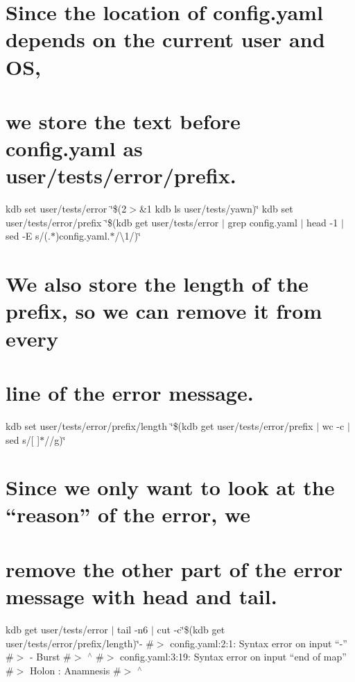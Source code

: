 \section*{Since the location of {\ttfamily config.\+yaml} depends on the current user and OS,}

\section*{we store the text before {\ttfamily config.\+yaml} as {\ttfamily user/tests/error/prefix}.}

kdb set user/tests/error \char`\"{}\$(2$>$\&1 kdb ls user/tests/yawn)\char`\"{} kdb set user/tests/error/prefix \char`\"{}\$(kdb get user/tests/error $\vert$ grep \textquotesingle{}config.\+yaml\textquotesingle{} $\vert$ head -\/1 $\vert$ sed -\/\+E \textquotesingle{}s/(.$\ast$)config.\+yaml.$\ast$/\textbackslash{}1/\textquotesingle{})\char`\"{} \section*{We also store the length of the prefix, so we can remove it from every}

\section*{line of the error message.}

kdb set user/tests/error/prefix/length \char`\"{}\$(kdb get user/tests/error/prefix $\vert$ wc -\/c $\vert$ sed \textquotesingle{}s/\mbox{[} \mbox{]}$\ast$//g\textquotesingle{})\char`\"{}

\section*{Since we only want to look at the “reason” of the error, we}

\section*{remove the other part of the error message with {\ttfamily head} and {\ttfamily tail}.}

kdb get user/tests/error $\vert$ tail -\/n6 $\vert$ cut -\/c\char`\"{}\$(kdb get user/tests/error/prefix/length)\char`\"{}-\/ \#$>$ config.\+yaml\+:2\+:1\+: Syntax error on input “-\/” \#$>$ -\/ Burst \#$>$ $^\wedge$ \#$>$ config.\+yaml\+:3\+:19\+: Syntax error on input “end of map” \#$>$ Holon \+: Anamnesis \#$>$ $^\wedge$

